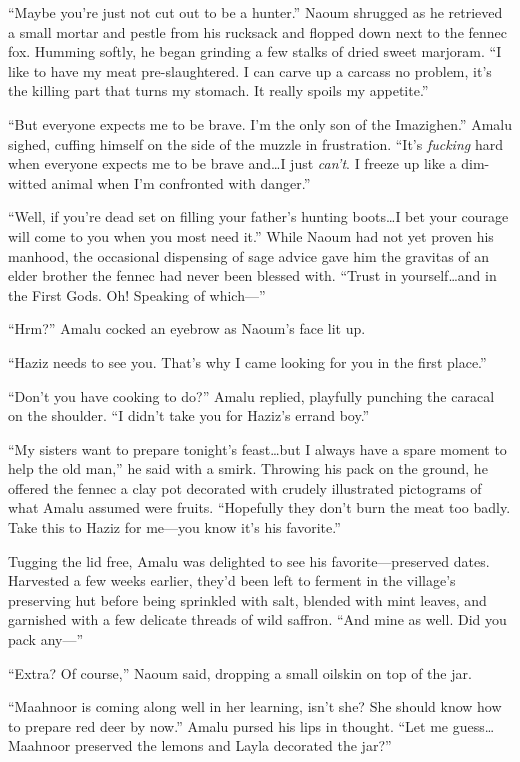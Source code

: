 ``Maybe you're just not cut out to be a hunter.'' Naoum shrugged as he retrieved a small mortar and pestle from his rucksack and flopped down next to the fennec fox. Humming softly, he began grinding a few stalks of dried sweet marjoram. ``I like to have my meat pre-slaughtered. I can carve up a carcass no problem, it's the killing part that turns my stomach. It really spoils my appetite.''

``But everyone expects me to be brave. I'm the only son of the Imazighen.'' Amalu sighed, cuffing himself on the side of the muzzle in frustration. ``It's \emph{fucking} hard when everyone expects me to be brave and\ldots{}I just \emph{can't}. I freeze up like a dim-witted animal when I'm confronted with danger.''

``Well, if you're dead set on filling your father's hunting boots\ldots{}I bet your courage will come to you when you most need it.'' While Naoum had not yet proven his manhood, the occasional dispensing of sage advice gave him the gravitas of an elder brother the fennec had never been blessed with. ``Trust in yourself\ldots{}and in the First Gods. Oh! Speaking of which---''

``Hrm?'' Amalu cocked an eyebrow as Naoum's face lit up.

``Haziz needs to see you. That's why I came looking for you in the first place.''

``Don't you have cooking to do?'' Amalu replied, playfully punching the caracal on the shoulder. ``I didn't take you for Haziz's errand boy.''

``My sisters want to prepare tonight's feast\ldots{}but I always have a spare moment to help the old man,'' he said with a smirk. Throwing his pack on the ground, he offered the fennec a clay pot decorated with crudely illustrated pictograms of what Amalu assumed were fruits. ``Hopefully they don't burn the meat too badly. Take this to Haziz for me---you know it's his favorite.''

Tugging the lid free, Amalu was delighted to see his favorite---preserved dates. Harvested a few weeks earlier, they'd been left to ferment in the village's preserving hut before being sprinkled with salt, blended with mint leaves, and garnished with a few delicate threads of wild saffron. ``And mine as well. Did you pack any---''

``Extra? Of course,'' Naoum said, dropping a small oilskin on top of the jar.

``Maahnoor is coming along well in her learning, isn't she? She should know how to prepare red deer by now.'' Amalu pursed his lips in thought. ``Let me guess\ldots{}Maahnoor preserved the lemons and Layla decorated the jar?''

